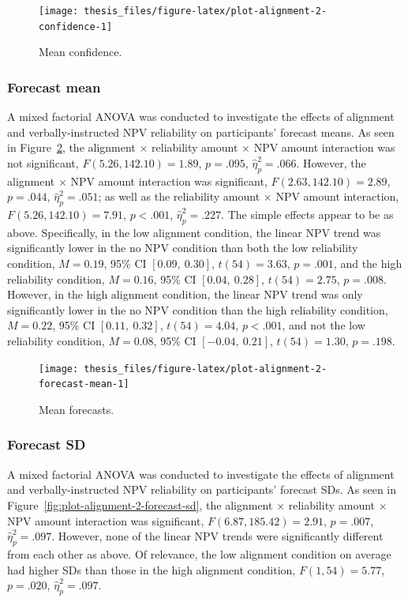 \documentclass[a4paper, nobind, dvipsnames]{templates/ociamthesis}
\theoremstyle{definition}
\theoremstyle{definition}
\theoremstyle{definition}
\theoremstyle{definition}
\theoremstyle{remark}
\begin{document}
\begin{figure}
\texttt{[image: thesis\_files/figure-latex/plot-alignment-2-confidence-1]} \caption{Mean confidence.}\label{fig:plot-alignment-2-confidence}
\end{figure}

\subsubsection{Forecast mean}

A mixed factorial ANOVA was conducted to investigate the effects of alignment
and verbally-instructed NPV reliability on participants' forecast means. As seen
in Figure~\ref{fig:plot-alignment-2-forecast-mean}, the alignment \(\times\)
reliability amount \(\times\) NPV amount interaction was not significant,
\(F(5.26, 142.10) = 1.89\), \(p = .095\), \(\hat{\eta}^2_p = .066\).
However, the alignment \(\times\) NPV amount interaction was significant,
\(F(2.63, 142.10) = 2.89\), \(p = .044\), \(\hat{\eta}^2_p = .051\); as well as the
reliability amount \(\times\) NPV amount interaction,
\(F(5.26, 142.10) = 7.91\), \(p < .001\), \(\hat{\eta}^2_p = .227\). The simple
effects appear to be as above. Specifically, in the low alignment condition, the
linear NPV trend was significantly lower in the no NPV condition than both the
low reliability condition,
\(M = 0.19\), 95\% CI \([0.09,~0.30]\), \(t(54) = 3.63\), \(p = .001\), and the high
reliability condition,
\(M = 0.16\), 95\% CI \([0.04,~0.28]\), \(t(54) = 2.75\), \(p = .008\). However, in the
high alignment condition, the linear NPV trend was only significantly lower in
the no NPV condition than the high reliability condition,
\(M = 0.22\), 95\% CI \([0.11,~0.32]\), \(t(54) = 4.04\), \(p < .001\), and not the low
reliability condition,
\(M = 0.08\), 95\% CI \([-0.04,~0.21]\), \(t(54) = 1.30\), \(p = .198\).



\begin{figure}
\texttt{[image: thesis\_files/figure-latex/plot-alignment-2-forecast-mean-1]} \caption{Mean forecasts.}\label{fig:plot-alignment-2-forecast-mean}
\end{figure}

\hypertarget{forecast-sd-alignment-2}{%
\subsubsection{Forecast SD}\label{forecast-sd-alignment-2}}

A mixed factorial ANOVA was conducted to investigate the effects of alignment
and verbally-instructed NPV reliability on participants' forecast SDs. As seen
in Figure~\ref{fig:plot-alignment-2-forecast-sd}, the alignment \(\times\)
reliability amount \(\times\) NPV amount interaction was significant,
\(F(6.87, 185.42) = 2.91\), \(p = .007\), \(\hat{\eta}^2_p = .097\).
However, none of the linear NPV trends were significantly different from each
other as above. Of relevance, the low alignment condition on average had higher
SDs than those in the high alignment condition,
\(F(1, 54) = 5.77\), \(p = .020\), \(\hat{\eta}^2_p = .097\).
\end{document}
